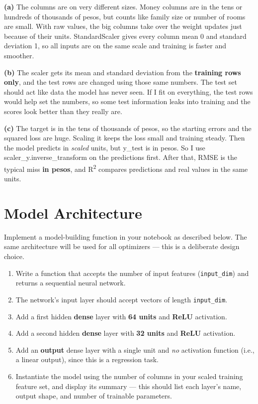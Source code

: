 \documentclass[12pt,a4paper]{article}
\begin{document}
\begin{answerbox}
\textbf{(a)} The columns are on very different sizes. Money columns are in the tens or hundreds of thousands of pesos, but counts like family size or number of rooms are small. With raw values, the big columns take over the weight updates just because of their units. StandardScaler gives every column mean 0 and standard deviation 1, so all inputs are on the same scale and training is faster and smoother.

\textbf{(b)} The scaler gets its mean and standard deviation from the \textbf{training rows only}, and the test rows are changed using those same numbers. The test set should act like data the model has never seen. If I fit on everything, the test rows would help set the numbers, so some test information leaks into training and the scores look better than they really are. 

\textbf{(c)} The target is in the tens of thousands of pesos, so the starting errors and the squared loss are huge. Scaling it keeps the loss small and training steady. Then the model predicts in \emph{scaled} units, but y\_test is in pesos. So I use scaler\_y.inverse\_transform on the predictions first. After that, RMSE is the typical miss \textbf{in pesos}, and R\textsuperscript{2} compares predictions and real values in the same units.

\end{answerbox}

\section{Model Architecture}

Implement a model-building function in your notebook as described below. The same
architecture will be used for all optimizers — this is a deliberate design choice.

\begin{stepbox}
\begin{enumerate}[leftmargin=*, label=\arabic*.]
  \item Write a function that accepts the number of input features (\texttt{input\_dim})
        and returns a sequential neural network.
  \item The network's input layer should accept vectors of length \texttt{input\_dim}.
  \item Add a first hidden \textbf{dense} layer with \textbf{64 units} and
        \textbf{ReLU} activation.
  \item Add a second hidden \textbf{dense} layer with \textbf{32 units} and
        \textbf{ReLU} activation.
  \item Add an \textbf{output} dense layer with a single unit and \emph{no}
        activation function (i.e., a linear output), since this is a regression task.
  \item Instantiate the model using the number of columns in your scaled training
        feature set, and display its summary — this should list each layer's name,
        output shape, and number of trainable parameters.
\end{enumerate}
\end{stepbox}
\end{document}
